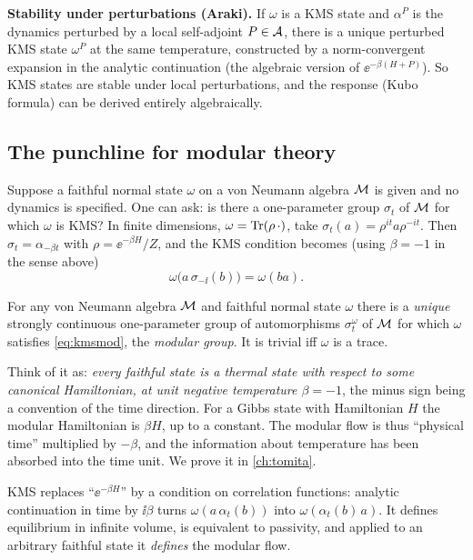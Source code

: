 \textbf{Stability under perturbations (Araki).} If $\omega$ is a KMS state and $\alpha^P$ is the dynamics perturbed by a local self-adjoint $P\in\mathcal{A}$, there is a unique perturbed KMS state $\omega^P$ at the same temperature, constructed by a norm-convergent expansion in the analytic continuation (the algebraic version of $\ee^{-\beta(H+P)}$). So KMS states are stable under local perturbations, and the response (Kubo formula) can be derived entirely algebraically.

\subsection{The punchline for modular theory}

Suppose a faithful normal state $\omega$ on a von Neumann algebra $\mathcal{M}$ is given and no dynamics is specified. One can ask: is there a one-parameter group $\sigma_t$ of $\mathcal{M}$ for which $\omega$ is KMS? In finite dimensions, $\omega=\operatorname{Tr}(\rho\,\cdot)$, take $\sigma_t(a)=\rho^{it}a\rho^{-it}$. Then $\sigma_t=\alpha_{-\beta t}$ with $\rho=\ee^{-\beta H}/Z$, and the KMS condition becomes (using $\beta=-1$ in the sense above)
\begin{equation}
\omega\big(a\,\sigma_{-\ii}(b)\big)=\omega(ba).\label{eq:kmsmod}
\end{equation}
\begin{theorem}
For any von Neumann algebra $\mathcal{M}$ and faithful normal state $\omega$ there is a \emph{unique} strongly continuous one-parameter group of automorphisms $\sigma^\omega_t$ of $\mathcal{M}$ for which $\omega$ satisfies \eqref{eq:kmsmod}, the \emph{modular group}. It is trivial iff $\omega$ is a trace.
\end{theorem}
Think of it as: \emph{every faithful state is a thermal state with respect to some canonical Hamiltonian, at unit negative temperature $\beta=-1$}, the minus sign being a convention of the time direction. For a Gibbs state with Hamiltonian $H$ the modular Hamiltonian is $\beta H$, up to a constant. The modular flow is thus ``physical time'' multiplied by $-\beta$, and the information about temperature has been absorbed into the time unit. We prove it in \cref{ch:tomita}.

\begin{keyidea}
KMS replaces ``$\ee^{-\beta H}$'' by a condition on correlation functions: analytic continuation in time by $\ii\beta$ turns $\omega(a\,\alpha_t(b))$ into $\omega(\alpha_t(b)\,a)$. It defines equilibrium in infinite volume, is equivalent to passivity, and applied to an arbitrary faithful state it \emph{defines} the modular flow.
\end{keyidea}

